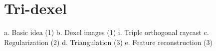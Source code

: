 
\chapter{Tri-dexel}

a.	Basic idea (1)
b.	Dexel images (1)
i.	Triple orthogonal raycast
c.	Regularization (2)
d.	Triangulation (3)
e.	Feature reconstruction (3)
